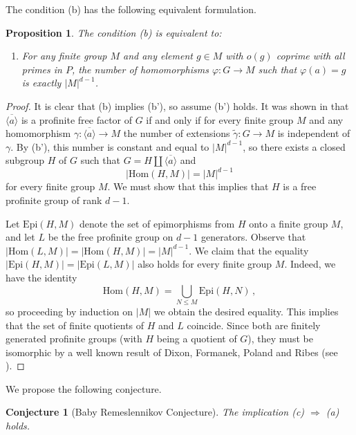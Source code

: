 \documentclass[a4paper]{amsart}
\newtheorem{pro}[lem]{Proposition}
\newtheorem{Conj}{Conjecture}
\theoremstyle{definition}
\theoremstyle{remark}
\begin{document}
The condition \textup{(b)} has the following equivalent formulation.

\begin{pro}
The condition \textup{(b)} is equivalent to:
\begin{enumerate}
    \item[(b')] For any finite group \(M\) and any element \(g \in M\) with \(o(g)\) coprime with all primes in \(P\), the number of homomorphisms \(\varphi \colon G \to M\) such that \(\varphi(a) = g\) is exactly \(|M|^{d-1}\).
\end{enumerate}
\end{pro}
\begin{proof} It is clear that (b) implies (b'), so assume (b') holds. It was shown in \cite[Prop. 3.1]{garridoFreeFactorsProfinite2023} that \(\overline{\langle a \rangle}\) is a profinite free factor of \(G\) if and only if for every finite group \(M\) and any homomorphism \(\gamma\colon \overline{\langle a \rangle} \to M\) the number of extensions \(\widetilde{\gamma}\colon G \to M\) is independent of \(\gamma\). By (b'), this number is constant and equal to \(|M|^{d-1}\), so there exists a closed subgroup \(H\) of \(G\) such that \(G = H \amalg \overline{\langle a \rangle}\) and \[\left |\mathrm{Hom}(H,M)\right | = |M|^{d-1}\] for every finite group \(M\). We must show that this implies that \(H\) is a free profinite group of rank \(d-1\).

Let \(\mathrm{Epi}(H,M)\) denote the set of epimorphisms from \(H\) onto a finite group \(M\), and let \(L\) be the free profinite group on \(d-1\) generators. Observe that \(|\mathrm{Hom}(L,M)| = |\mathrm{Hom}(H,M)| = |M|^{d-1}\). We claim that the equality \(|\mathrm{Epi}(H,M)| = |\mathrm{Epi}(L,M)|\) also holds for every finite group \(M\). Indeed, we have the identity \[\mathrm{Hom}(H,M) = \bigcup_{N \leq M} \mathrm{Epi}(H,N)\,,\] so proceeding by induction on \(|M|\) we obtain the desired equality. This implies that the set of finite quotients of \(H\) and \(L\) coincide. Since both are finitely generated profinite groups (with \(H\) being a quotient of \(G\)), they must be isomorphic by a well known result of Dixon, Formanek, Poland and Ribes (see \cite[Thm. 3.2.3]{Wilkes}).
\end{proof}

We propose the following conjecture.

\begin{Conj}[Baby Remeslennikov Conjecture]   
\label{Baby}
The implication \textup{(c)} $\Rightarrow$ \textup{(a)} holds.
\end{Conj}
\end{document}
